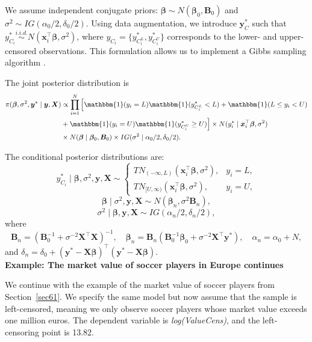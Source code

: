 We assume independent conjugate priors: $\bm{\beta} \sim N(\bm{\beta}_0, \bm{B}_0)$ and $\sigma^2 \sim IG(\alpha_0/2, \delta_0/2)$. Using data augmentation, we introduce $\bm{y}_C^*$ such that $y_{C_i}^* \stackrel{i.i.d.}{\sim} N(\bm{x}_i^{\top}\bm{\beta}, \sigma^2)$, where $y_{C_i} = \{y_{C_i^L}^*, y_{C_i^U}^*\}$ corresponds to the lower- and upper-censored observations. This formulation allows us to implement a Gibbs sampling algorithm \cite{Chib1992}.

The joint posterior distribution is
\begin{align*}
	\pi(\bm{\beta}, \sigma^2, \bm{y}^* \mid \bm{y}, \bm{X})
	&\propto \prod_{i=1}^N \Big[
	\mathbbm{1}(y_i = L)\mathbbm{1}(y_{C_i^L}^* < L)+ \mathbbm{1}(L \leq y_i < U)\\
	&+ \mathbbm{1}(y_i = U)\mathbbm{1}(y_{C_i^U}^* \geq U)
	\Big] \times N(y_i^* \mid \bm{x}_i^{\top}\bm{\beta}, \sigma^2) \\
	&
	\times N(\bm{\beta} \mid \bm{\beta}_0, \bm{B}_0)
	\times IG(\sigma^2 \mid \alpha_0/2, \delta_0/2).
\end{align*}

The conditional posterior distributions are:
\begin{equation*}
	y_{C_i}^* \mid \bm{\beta}, \sigma^2, \bm{y}, \bm{X} \sim
	\begin{cases}
		TN_{(-\infty, L)}(\bm{x}_i^{\top}\bm{\beta}, \sigma^2), & y_i = L, \\
		TN_{[U, \infty)}(\bm{x}_i^{\top}\bm{\beta}, \sigma^2), & y_i = U,
	\end{cases}
\end{equation*}
\begin{equation*}
	\bm{\beta} \mid \sigma^2, \bm{y}, \bm{X} \sim N(\bm{\beta}_n, \sigma^2\bm{B}_n),
\end{equation*}
\begin{equation*}
	\sigma^2 \mid \bm{\beta}, \bm{y}, \bm{X} \sim IG(\alpha_n/2, \delta_n/2),
\end{equation*}
where 
\[
\bm{B}_n = (\bm{B}_0^{-1} + \sigma^{-2}\bm{X}^{\top}\bm{X})^{-1}, \quad
\bm{\beta}_n = \bm{B}_n(\bm{B}_0^{-1}\bm{\beta}_0 + \sigma^{-2}\bm{X}^{\top}\bm{y}^*), \quad
\alpha_n = \alpha_0 + N,
\] and
\(\delta_n = \delta_0 + (\bm{y}^* - \bm{X}\bm{\beta})^{\top}(\bm{y}^* - \bm{X}\bm{\beta}).\)\\

\textbf{Example: The market value of soccer players in Europe continues}

We continue with the example of the market value of soccer players from Section~\ref{sec61}. We specify the same model but now assume that the sample is left-censored, meaning we only observe soccer players whose market value exceeds one million euros. The dependent variable is \textit{log(ValueCens)}, and the left-censoring point is 13.82.

